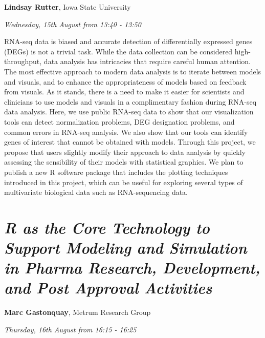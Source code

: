 \documentclass[]{book}
\theoremstyle{definition}
\theoremstyle{definition}
\theoremstyle{definition}
\theoremstyle{remark}
\begin{document}
\textbf{Lindsay Rutter}, Iowa State University

\emph{Wednesday, 15th August from 13:40 - 13:50}

RNA-seq data is biased and accurate detection of differentially
expressed genes (DEGs) is not a trivial task. While the data collection
can be considered high-throughput, data analysis has intricacies that
require careful human attention. The most effective approach to modern
data analysis is to iterate between models and visuals, and to enhance
the appropriateness of models based on feedback from visuals. As it
stands, there is a need to make it easier for scientists and clinicians
to use models and visuals in a complimentary fashion during RNA-seq data
analysis. Here, we use public RNA-seq data to show that our
visualization tools can detect normalization problems, DEG designation
problems, and common errors in RNA-seq analysis. We also show that our
tools can identify genes of interest that cannot be obtained with
models. Through this project, we propose that users slightly modify
their approach to data analysis by quickly assessing the sensibility of
their models with statistical graphics. We plan to publish a new R
software package that includes the plotting techniques introduced in
this project, which can be useful for exploring several types of
multivariate biological data such as RNA-sequencing data.

\hypertarget{r-as-the-core-technology-to-support-modeling-and-simulation-in-pharma-research-development-and-post-approval-activities}{%
\section{\texorpdfstring{\emph{R as the Core Technology to Support
Modeling and Simulation in Pharma Research, Development, and Post
Approval
Activities}}{R as the Core Technology to Support Modeling and Simulation in Pharma Research, Development, and Post Approval Activities}}\label{r-as-the-core-technology-to-support-modeling-and-simulation-in-pharma-research-development-and-post-approval-activities}}

\textbf{Marc Gastonquay}, Metrum Research Group

\emph{Thursday, 16th August from 16:15 - 16:25}
\end{document}
